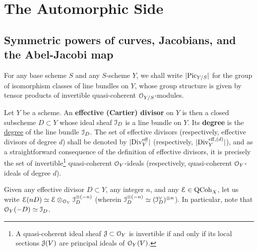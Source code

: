 \section{The Automorphic Side}
    \subsection{Symmetric powers of curves, Jacobians, and the Abel-Jacobi map}
        \begin{convention} \label{conv: picard_group}
            For any base scheme $S$ and any $S$-scheme $Y$, we shall write $|\mathrm{Pic}_{Y/S}|$ for the group of isomorphism classes of line bundles on $Y$, whose group structure is given by tensor products of invertible quasi-coherent $\mathcal{O}_{Y/S}$-modules.
        \end{convention}
        \begin{definition} \label{def: effective_divisors}
            Let $Y$ be a scheme. An \textbf{effective (Cartier) divisor} on $Y$ is then a closed subscheme $D \subset Y$ whose ideal sheaf $\mathcal{I}_D$ is a line bundle on $Y$. Its \textbf{degree} is the \href{https://stacks.math.columbia.edu/tag/0AYQ}{\underline{degree}} of the line bundle $\mathcal{I}_D$.  
            The set of effective divisors (respectively, effective divisors of degree $d$) shall be denoted by $|\mathrm{Div}_Y^{\mathrm{eff}}|$ (respectively, $|\mathrm{Div}_Y^{\mathrm{eff}, (d)}|$), and as a straightforward consequence of the definition of effective divisors, it is precisely the set of invertible\footnote{A quasi-coherent ideal sheaf $\mathcal{J} \subset \mathcal{O}_Y$ is invertible if and only if its local sections $\mathcal{J}(V)$ are principal ideals of $\mathcal{O}_Y(V)$.} quasi-coherent $\mathcal{O}_Y$-ideals (respectively, quasi-coherent $\mathcal{O}_Y$-ideals of degree $d$).
        \end{definition}
        \begin{convention}
            Given any effective divisor $D \subset Y$, any integer $n$, and any $\mathcal{E} \in \mathrm{QCoh}_X$, let us write $\mathcal{E}(nD) \simeq \mathcal{E} \otimes_{\mathcal{O}_Y} \mathcal{I}_D^{\otimes (-n)}$ (wherein $\mathcal{I}_D^{\otimes (-n)} \simeq (\mathcal{I}_D^{\vee})^{\otimes n}$). In particular, note that $\mathcal{O}_Y(-D) \simeq \mathcal{I}_D$.
        \end{convention}
